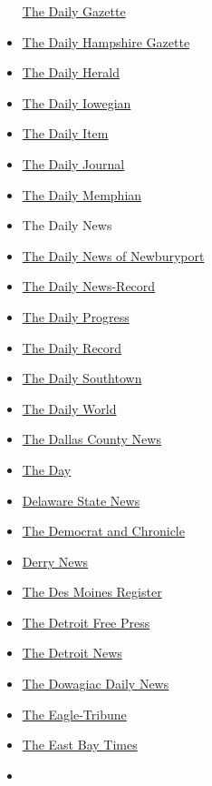 \begin{itemize}
  \href{https://dailygazette.com/}{The Daily Gazette}
\item
  \href{https://www.gazettenet.com/}{The Daily Hampshire Gazette}
\item
  \href{https://www.dailyherald.com/}{The Daily Herald}
\item
  \href{https://www.dailyiowegian.com/}{The Daily Iowegian}
\item
  \href{https://www.dailyitem.com/}{The Daily Item}
\item
  \href{http://www.dailyjournal.net/}{The Daily Journal}
\item
  \href{https://dailymemphian.com/}{The Daily Memphian}
\item
  The Daily News
\item
  \href{https://www.newburyportnews.com/}{The Daily News of Newburyport}
\item
  \href{https://www.dnronline.com/}{The Daily News-Record}
\item
  \href{https://www.dailyprogress.com/}{The Daily Progress}
\item
  \href{https://www.dailyrecord.com/}{The Daily Record}
\item
  \href{https://www.chicagotribune.com/suburbs/daily-southtown/}{The
  Daily Southtown}
\item
  \href{https://www.dailyworld.com/}{The Daily World}
\item
  \href{https://www.adelnews.com/}{The Dallas County News}
\item
  \href{https://www.theday.com/}{The Day}
\item
  \href{https://delawarestatenews.net/}{Delaware State News}
\item
  \href{https://www.democratandchronicle.com/}{The Democrat and
  Chronicle}
\item
  \href{https://www.derrynews.com/}{Derry News}
\item
  \href{https://www.desmoinesregister.com/}{The Des Moines Register}
\item
  \href{https://www.freep.com/}{The Detroit Free Press}
\item
  \href{https://www.detroitnews.com/}{The Detroit News}
\item
  \href{https://www.leaderpub.com/category/news/dowagiac-news/}{The
  Dowagiac Daily News}
\item
  \href{https://www.eagletribune.com/}{The Eagle-Tribune}
\item
  \href{https://www.eastbaytimes.com/}{The East Bay Times}
\item

\end{itemize}
